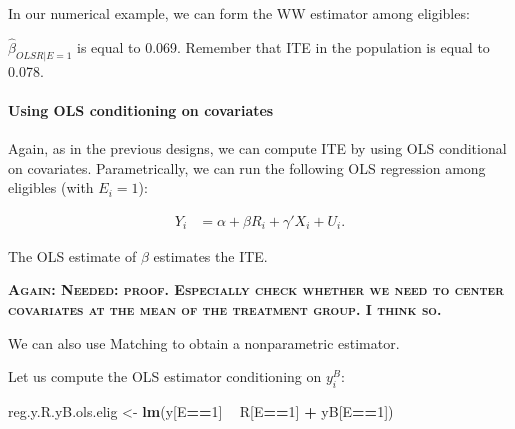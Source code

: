 \documentclass[]{book}
\newenvironment{Shaded}{\begin{snugshade}}{\end{snugshade}}
\newcommand{\KeywordTok}[1]{\textcolor[rgb]{0.13,0.29,0.53}{\textbf{#1}}}
\newcommand{\DecValTok}[1]{\textcolor[rgb]{0.00,0.00,0.81}{#1}}
\newcommand{\StringTok}[1]{\textcolor[rgb]{0.31,0.60,0.02}{#1}}
\newcommand{\OperatorTok}[1]{\textcolor[rgb]{0.81,0.36,0.00}{\textbf{#1}}}
\newcommand{\NormalTok}[1]{#1}
\let\oldparagraph\paragraph
\renewcommand{\paragraph}[1]{\oldparagraph{#1}\mbox{}}
\theoremstyle{definition}
\theoremstyle{definition}
\theoremstyle{definition}
\theoremstyle{remark}
\let\BeginKnitrBlock\begin \let\EndKnitrBlock\end
\begin{document}
\BeginKnitrBlock{example}
\protect\hypertarget{exm:unnamed-chunk-95}{}{\label{exm:unnamed-chunk-95}
}In our numerical example, we can form the WW estimator among eligibles:
\EndKnitrBlock{example}

\begin{Shaded}
\end{Shaded}

\(\hat{\beta}_{OLSR|E=1}\) is equal to 0.069. Remember that ITE in the
population is equal to 0.078.

\paragraph{Using OLS conditioning on
covariates}\label{using-ols-conditioning-on-covariates-2}

Again, as in the previous designs, we can compute ITE by using OLS
conditional on covariates. Parametrically, we can run the following OLS
regression among eligibles (with \(E_i=1\)):

\begin{align*}
    Y_i &  = \alpha +  \beta R_i + \gamma' X_i + U_i.
  \end{align*}

The OLS estimate of \(\beta\) estimates the ITE.

\textbf{\textsc{Again: Needed: proof. Especially check whether we need
to center covariates at the mean of the treatment group. I think so.}}

We can also use Matching to obtain a nonparametric estimator.

\BeginKnitrBlock{example}
\protect\hypertarget{exm:unnamed-chunk-96}{}{\label{exm:unnamed-chunk-96}
}Let us compute the OLS estimator conditioning on \(y_i^B\):
\EndKnitrBlock{example}

\begin{Shaded}
\begin{Highlighting}[]
\NormalTok{reg.y.R.yB.ols.elig <-}\StringTok{ }\KeywordTok{lm}\NormalTok{(y[E}\OperatorTok{==}\DecValTok{1}\NormalTok{] }\OperatorTok{~}\StringTok{ }\NormalTok{R[E}\OperatorTok{==}\DecValTok{1}\NormalTok{] }\OperatorTok{+}\StringTok{ }\NormalTok{yB[E}\OperatorTok{==}\DecValTok{1}\NormalTok{])}
\end{Highlighting}
\end{Shaded}
\end{document}
